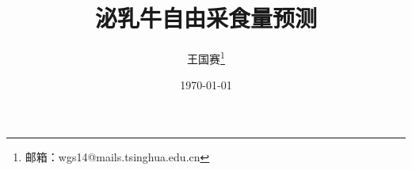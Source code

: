\renewcommand{\algorithmicrequire}{ \textbf{Input:}}     %
\renewcommand{\algorithmicensure}{ \textbf{Initialize:}} %
\renewcommand{\algorithmicreturn}{ \textbf{Output:}}     %
\newcommand{\para}[1]{\smallskip\noindent\textbf{#1}}

\newcommand{\wgs}[1]{\textcolor{blue}{\uline{#1}}}

\usepackage{fancyhdr}   %


\usepackage{hyperref}   %
\hypersetup{colorlinks, bookmarks, unicode} %

\graphicspath{{figures/}}


\title{泌乳牛自由采食量预测}
\author{王国赛\thanks{邮箱：wgs14@mails.tsinghua.edu.cn}}
\date{\today}


    \maketitle
    \thispagestyle{fancy}












%
%
%

\renewcommand\refname{参考文献}
\small

 



